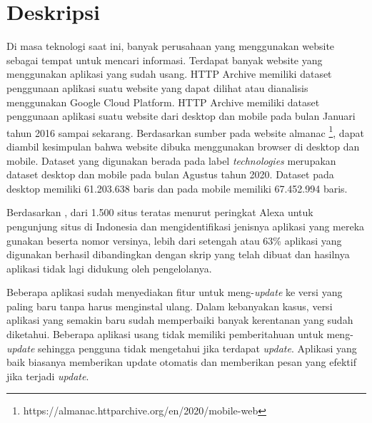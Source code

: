 \documentclass[a4paper,twoside]{article}
\begin{document}
	
	\title{\@judultopik}
	\author{\nama \textendash \@npm} 
	
	\newcommand{\nama}{Vinson Tandra}
	\newcommand{\@npm}{2016730042}
	\newcommand{\@judultopik}{Pengukuran Aplikasi Usang Di HTTP Archive} %
	\newcommand{\jumpemb}{1} %
	\newcommand{\tanggal}{15/10/2021}
	
	
	\maketitle
	
	
	\section{Deskripsi}
	Di masa teknologi saat ini, banyak perusahaan yang menggunakan website sebagai tempat untuk mencari informasi. Terdapat banyak website yang menggunakan aplikasi yang sudah usang. HTTP Archive memiliki dataset penggunaan aplikasi suatu website yang dapat dilihat atau dianalisis menggunakan Google Cloud Platform. HTTP Archive memiliki dataset penggunaan aplikasi suatu website dari desktop dan mobile pada bulan Januari tahun 2016 sampai sekarang. Berdasarkan sumber pada website almanac \footnote{https://almanac.httparchive.org/en/2020/mobile-web}, dapat diambil kesimpulan bahwa website dibuka menggunakan browser di desktop dan mobile. Dataset yang digunakan berada pada label \textit{technologies} merupakan dataset desktop dan mobile pada bulan Agustus tahun 2020. Dataset pada desktop memiliki 61.203.638 baris dan pada mobile memiliki 67.452.994 baris. 
	
	Berdasarkan \cite{pascal}, dari 1.500 situs teratas menurut peringkat Alexa untuk pengunjung situs di Indonesia dan mengidentifikasi jenisnya aplikasi yang mereka gunakan beserta nomor versinya, lebih dari setengah atau 63\% aplikasi yang digunakan berhasil dibandingkan dengan skrip yang telah dibuat dan hasilnya aplikasi tidak lagi didukung oleh pengelolanya.
	
	Beberapa aplikasi sudah menyediakan fitur untuk meng-\textit{update} ke versi yang paling baru tanpa harus menginstal ulang. Dalam kebanyakan kasus, versi aplikasi yang semakin baru sudah memperbaiki banyak kerentanan yang sudah diketahui. Beberapa aplikasi usang tidak memiliki pemberitahuan untuk meng-\textit{update} sehingga pengguna tidak mengetahui jika terdapat \textit{update}. Aplikasi yang baik biasanya memberikan update otomatis dan memberikan pesan yang efektif jika terjadi \textit{update}. 
	
\end{document}
